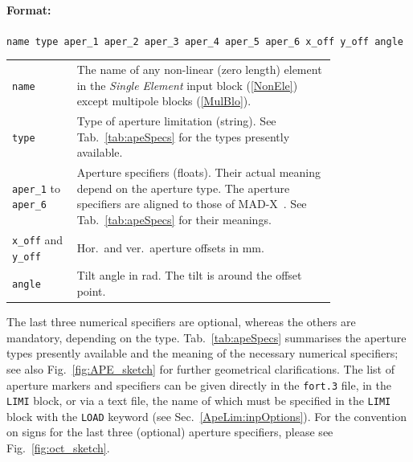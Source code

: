 \paragraph{Format:}
\texttt{name type aper\_1 aper\_2 aper\_3 aper\_4 aper\_5 aper\_6 x\_off y\_off angle}

\begin{longtabu}{@{}lp{0.8\linewidth}}
    \texttt{name}   & The name of any non-linear (zero length) element in the \textit{Single Element} input block (\ref{NonEle}) except multipole blocks (\ref{MulBlo}). \\
    \texttt{type}   & Type of aperture limitation (string). See Tab.~\ref{tab:apeSpecs} for the types
                      presently available. \\
    \texttt{aper\_1} to \texttt{aper\_6}  & Aperture specifiers (floats).
                      Their actual meaning depend on the aperture type. The aperture specifiers are
                      aligned to those of MAD-X~\cite{MAD}. See Tab.~\ref{tab:apeSpecs} for their
                      meanings.\\
    \texttt{x\_off} and \texttt{y\_off}  & Hor.~and ver.~aperture offsets in mm. \\
    \texttt{angle}  & Tilt angle in rad. The tilt is around the offset point.\\
\end{longtabu}

The last three numerical specifiers are optional, whereas the others are mandatory, depending
on the type. Tab.~\ref{tab:apeSpecs} summarises the aperture types presently available
and the meaning of the necessary numerical specifiers; see also Fig.~\ref{fig:APE_sketch}
for further geometrical clarifications. The list of aperture markers and specifiers can
be given directly in the \texttt{fort.3} file, in the \texttt{LIMI} block, or via a
text file, the name of which must be specified in the \texttt{LIMI} block with the
\texttt{LOAD} keyword (see Sec.~\ref{ApeLim:inpOptions}). For the convention on signs for
the last three (optional) aperture specifiers, please see Fig.~\ref{fig:oct_sketch}.


